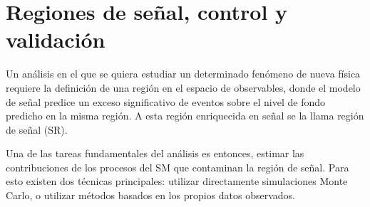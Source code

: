 \section{Regiones de señal, control y validación}
\label{sec:regiones}

Un análisis en el que se quiera estudiar un determinado fenómeno de nueva física
requiere la definición de una región en el espacio de observables, donde el modelo de señal
predice un exceso significativo de eventos sobre el nivel de fondo predicho en
la misma región. A esta región enriquecida en señal se la llama región de señal
(SR).

Una de las tareas fundamentales del análisis es entonces, estimar las
contribuciones de los procesos del SM que contaminan la región de
señal.
Para esto existen dos técnicas principales: utilizar directamente simulaciones Monte Carlo,
o utilizar métodos basados en los propios datos observados.




